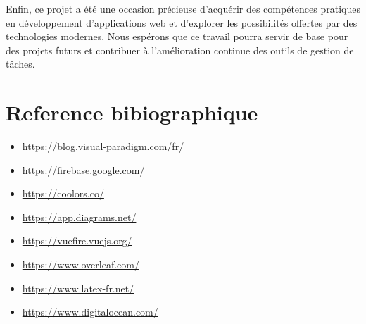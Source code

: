 \documentclass[a4paper,12pt]{report}
\begin{document}
    Enfin, ce projet a été une occasion précieuse d’acquérir des compétences pratiques en développement d’applications web et d’explorer les possibilités offertes par des technologies modernes. Nous espérons que ce travail pourra servir de base pour des projets futurs et contribuer à l’amélioration continue des outils de gestion de tâches.

   \chapter*{Reference bibiographique}
   \begin{itemize}
     \item \url{https://blog.visual-paradigm.com/fr/}
     \item \url{https://firebase.google.com/}
     \item \url{https://coolors.co/}
     \item \url{https://app.diagrams.net/}
     \item \url{https://vuefire.vuejs.org/}
     \item \url{https://www.overleaf.com/}
     \item \url{https://www.latex-fr.net/}
     \item \url{https://www.digitalocean.com/}
   \end{itemize}
    
\end{document}
